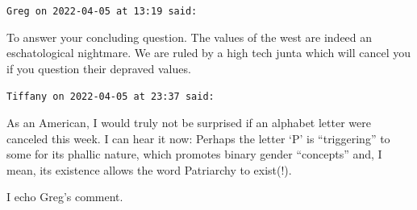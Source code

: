 \begin{footnotesize}
\begin{sffamily}
\hfill

\texttt{Greg on 2022-04-05 at 13:19 said:}

To answer your concluding question. The values of the west are indeed an eschatological nightmare. We are ruled by a high tech junta which will cancel you if you question their depraved values.

\hfill

\texttt{Tiffany on 2022-04-05 at 23:37 said:}

As an American, I would truly not be surprised if an alphabet letter were canceled this week. I can hear it now: Perhaps the letter `P' is ``triggering'' to some for its phallic nature, which promotes binary gender ``concepts'' and, I mean, its existence allows the word Patriarchy to exist(!).

I echo Greg's comment.

\end{sffamily}
\end{footnotesize}

